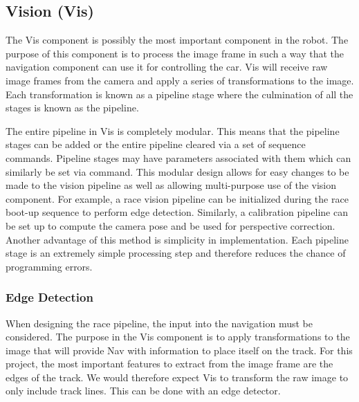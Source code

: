 \documentclass{article}
\begin{document}
\subsection{Vision (Vis)}

The Vis component is possibly the most important component in the robot. The purpose of this component is to process the image frame in such a way that the navigation component can use it for controlling the car. Vis will receive raw image frames from the camera and apply a series of transformations to the image. Each transformation is known as a pipeline stage where the culmination of all the stages is known as the pipeline.

The entire pipeline in Vis is completely modular. This means that the pipeline stages can be added or the entire pipeline cleared via a set of sequence commands. Pipeline stages may have parameters associated with them which can similarly be set via command. This modular design allows for easy changes to be made to the vision pipeline as well as allowing multi-purpose use of the vision component. For example, a race vision pipeline can be initialized during the race boot-up sequence to perform edge detection. Similarly, a calibration pipeline can be set up to compute the camera pose and be used for perspective correction. Another advantage of this method is simplicity in implementation. Each pipeline stage is an extremely simple processing step and therefore reduces the chance of programming errors.

\subsubsection{Edge Detection}

When designing the race pipeline, the input into the navigation must be considered. The purpose in the Vis component is to apply transformations to the image that will provide Nav with information to place itself on the track. For this project, the most important features to extract from the image frame are the edges of the track. We would therefore expect Vis to transform the raw image to only include track lines. This can be done with an edge detector.
\end{document}
